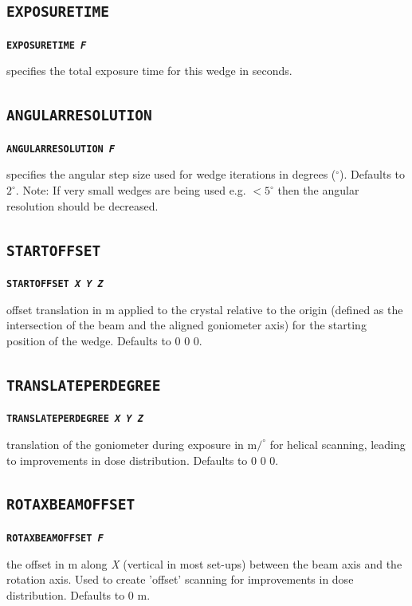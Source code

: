 \documentclass[a4paper]{article}
\newcommand{\Keyword}[1]{\texttt{\textbf{#1}}\xspace}
\begin{document}
\subsection{\Keyword{EXPOSURETIME}}

\noindent \Keyword{EXPOSURETIME \textit{F}}

specifies the total exposure time for this wedge in seconds.



\subsection{\Keyword{ANGULARRESOLUTION}}

\noindent \Keyword{ANGULARRESOLUTION \textit{F}}

specifies the angular step size used for wedge iterations in degrees ($^\circ$). Defaults to $2^\circ$.
\newline
Note: If very small wedges are being used e.g. $<5^{\circ}$ then the angular resolution should be decreased.



\subsection{\Keyword{STARTOFFSET}}

\noindent \Keyword{STARTOFFSET \textit{X Y Z}}

offset translation in \hbox{\textmu}m applied to the crystal relative to the origin (defined as the intersection of the beam and the aligned goniometer axis) for the starting position of the wedge. Defaults to 0 0 0.



\subsection{\Keyword{TRANSLATEPERDEGREE}}

\noindent \Keyword{TRANSLATEPERDEGREE \textit{X Y Z}}

translation of the goniometer during exposure in \hbox{\textmu}m$/^{\circ}$ for helical scanning, leading to improvements in dose distribution. Defaults to 0 0 0.



\subsection{\Keyword{ROTAXBEAMOFFSET}}

\noindent \Keyword{ROTAXBEAMOFFSET \textit{F}}

the offset in \hbox{\textmu}m along \textit{X} (vertical in most set-ups) between the beam axis and the rotation axis. Used to create 'offset' scanning for improvements in dose distribution. Defaults to 0 \hbox{\textmu}m.
\end{document}
